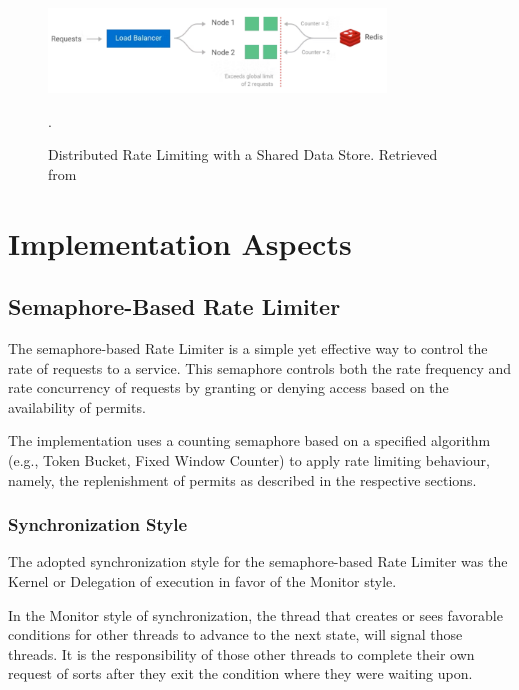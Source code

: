 \begin{figure}[!htb]
    \centering
    \includegraphics[width=0.8\textwidth]{../figures/06_distributed_rate_limiting}
    \caption{Distributed Rate Limiting with a Shared Data Store.
    Retrieved from~\cite{kong-rate-limiting}}.
    \label{fig:distributed-rate-limiting-shared}
\end{figure}


\section{Implementation Aspects}\label{sec:rate-limiter-implementation}

\subsection{Semaphore-Based Rate Limiter}\label{subsec:rate-limiter-semaphore-based}

The semaphore-based Rate Limiter is a simple yet effective way to control the rate of requests to a service.
This semaphore controls both the rate frequency and rate concurrency of requests by granting or denying access based on the availability of permits.

The implementation uses a counting semaphore based on a specified algorithm
(e.g., Token Bucket, Fixed Window Counter) to apply rate limiting behaviour, namely,
the replenishment of permits as described in the respective sections.

\subsubsection{Synchronization Style}\label{subsubsec:rate-limiter-synchronization-style}

The adopted synchronization style for the semaphore-based Rate Limiter was the Kernel or Delegation of execution in favor of the Monitor style.

In the Monitor style of synchronization, the thread that creates or sees favorable conditions for other threads to advance to the next state, will signal those threads.
It is the responsibility of those other threads to complete their own request of sorts after they exit the condition where they were waiting upon.

